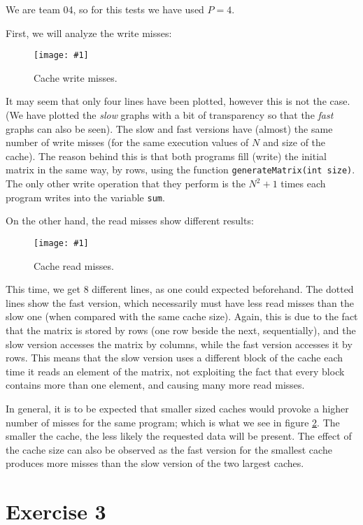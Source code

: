 \documentclass{article}
\newcommand{\myFigure}[4]{%
    \begin{figure}[!ht]
        \texttt{[image: \#1]}
        \centering
        \caption{#2}
        \label{#3}
    \end{figure}
}
\begin{document}
We are team 04, so for this tests we have used $P=4$.

First, we will analyze the write misses: 

\myFigure{../material_P3/out2/mv_att1/cache_escritura.png}{Cache write misses.}{cache_escritura}{0.545}


It may seem that only four lines have been plotted, however this is not the case. (We have plotted the \emph{slow} graphs with a bit of transparency so that the \emph{fast} graphs can also be seen). The slow and fast versions have (almost) the same number of write misses (for the same execution values of $N$ and size of the cache). The reason behind this is that both programs fill (write) the initial matrix in the same way, by rows, using the function \texttt{generateMatrix(int size)}. The only other write operation that they perform is the $N^2+1$ times each program writes into the variable \texttt{sum}. 

On the other hand, the read misses show different results:

\myFigure{../material_P3/out2/mv_att1/cache_lectura.png}{Cache read misses.}{cache_lectura}{0.545}

This time, we get 8 different lines, as one could expected beforehand. The dotted lines show the fast version, which necessarily must have less read misses than the slow one (when compared with the same cache size). Again, this is due to the fact that the matrix is stored by rows (one row beside the next, sequentially), and the slow version accesses the matrix by columns, while the fast version accesses it by rows. This means that the slow version uses a different block of the cache each time it reads an element of the matrix, not exploiting the fact that every block contains more than one element, and causing many more read misses.

In general, it is to be expected that smaller sized caches would provoke a higher number of misses for the same program; which is what we see in figure \ref{cache_lectura}. The smaller the cache, the less likely the requested data will be present.
The effect of the cache size can also be observed as the fast version for the smallest cache produces more misses than the slow version of the two largest caches. 


\section*{Exercise 3}
\end{document}
